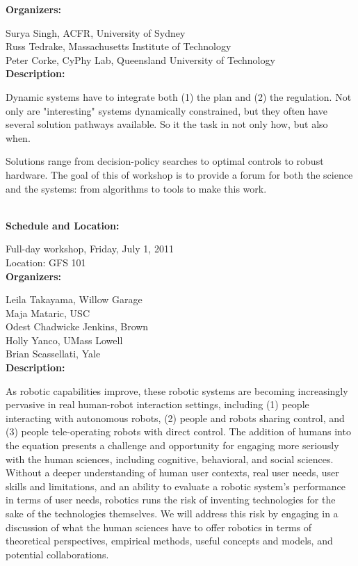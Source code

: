 {{\bf  Organizers:}

Surya Singh, ACFR, University of Sydney\\
Russ Tedrake, Massachusetts Institute of Technology\\
Peter Corke, CyPhy Lab, Queensland University of Technology\\[4mm]

{\bf Description: }

Dynamic systems have to integrate both (1) the plan and (2) the regulation. Not only are "interesting" systems dynamically constrained, but they often have several solution pathways available. So it the task in not only how, but also when. 

Solutions range from decision-policy searches to optimal controls to robust hardware. The goal of this of workshop is to provide a forum for both the science and the systems: from algorithms to tools to make this work.


\\[5mm]

{\bf  Schedule and Location:}

Full-day workshop, Friday, July 1, 2011\\
Location: GFS 101 \\[4mm]

{\bf  Organizers:}

Leila Takayama, Willow Garage\\
Maja Mataric, USC\\
Odest Chadwicke Jenkins, Brown\\
Holly Yanco, UMass Lowell\\
Brian Scassellati, Yale\\[4mm]

{\bf Description: }

As robotic capabilities improve, these robotic systems are becoming increasingly pervasive in real human-robot interaction settings, including (1) people interacting with autonomous robots, (2) people and robots sharing control, and (3) people tele-operating robots with direct control. The addition of humans into the equation presents a challenge and opportunity for engaging more seriously with the human sciences, including cognitive, behavioral, and social sciences. Without a deeper understanding of human user contexts, real user needs, user skills and limitations, and an ability to evaluate a robotic system’s performance in terms of user needs, robotics runs the risk of inventing technologies for the sake of the technologies themselves. We will address this risk by engaging in a discussion of what the human sciences have to offer robotics in terms of theoretical perspectives, empirical methods, useful concepts and models, and potential collaborations.

}

